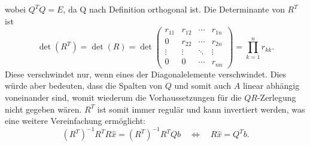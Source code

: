 wobei $Q^TQ=E$, da Q nach Definition orthogonal ist.
Die Determinante von $R^T$ ist
\begin{equation*}
\det(R^T)=\det(R)=\det
\begin{pmatrix}
r_{11}&r_{12}&\cdots &r_{1n}\\
0     &r_{22}&\cdots &r_{2n}\\
\vdots&\vdots&\ddots&\vdots\\
0&0&\cdots&r_{nn}
\end{pmatrix}=\prod_{k=1}^{n}r_{kk}.
\end{equation*}
Diese verschwindet nur, wenn eines der Diagonalelemente verschwindet.
Dies würde aber bedeuten, dass die Spalten von $Q$ und somit auch $A$ linear abhängig voneinander sind, womit wiederum die Vorhaussetzungen für die $QR$-Zerlegung nicht gegeben wären.
$R^T$ ist somit immer regulär und kann invertiert werden, was eine weitere Vereinfachung ermöglicht:
\begin{equation}
(R^T)^{-1}R^TR\hat{x}=(R^T)^{-1}R^TQb\quad\Leftrightarrow\quad R\hat{x}=Q^Tb\label{qr:ls2}.
\end{equation}
